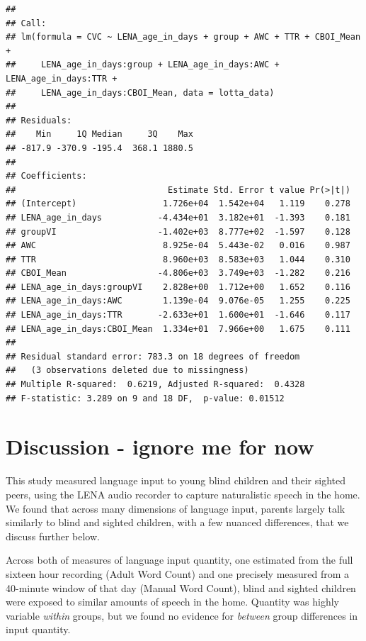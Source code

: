 \documentclass[
  man,floatsintext]{apa6}
\begin{document}
\begin{verbatim}
## 
## Call:
## lm(formula = CVC ~ LENA_age_in_days + group + AWC + TTR + CBOI_Mean + 
##     LENA_age_in_days:group + LENA_age_in_days:AWC + LENA_age_in_days:TTR + 
##     LENA_age_in_days:CBOI_Mean, data = lotta_data)
## 
## Residuals:
##    Min     1Q Median     3Q    Max 
## -817.9 -370.9 -195.4  368.1 1880.5 
## 
## Coefficients:
##                              Estimate Std. Error t value Pr(>|t|)
## (Intercept)                 1.726e+04  1.542e+04   1.119    0.278
## LENA_age_in_days           -4.434e+01  3.182e+01  -1.393    0.181
## groupVI                    -1.402e+03  8.777e+02  -1.597    0.128
## AWC                         8.925e-04  5.443e-02   0.016    0.987
## TTR                         8.960e+03  8.583e+03   1.044    0.310
## CBOI_Mean                  -4.806e+03  3.749e+03  -1.282    0.216
## LENA_age_in_days:groupVI    2.828e+00  1.712e+00   1.652    0.116
## LENA_age_in_days:AWC        1.139e-04  9.076e-05   1.255    0.225
## LENA_age_in_days:TTR       -2.633e+01  1.600e+01  -1.646    0.117
## LENA_age_in_days:CBOI_Mean  1.334e+01  7.966e+00   1.675    0.111
## 
## Residual standard error: 783.3 on 18 degrees of freedom
##   (3 observations deleted due to missingness)
## Multiple R-squared:  0.6219, Adjusted R-squared:  0.4328 
## F-statistic: 3.289 on 9 and 18 DF,  p-value: 0.01512
\end{verbatim}

\hypertarget{discussion---ignore-me-for-now}{%
\section{Discussion - ignore me for now}\label{discussion---ignore-me-for-now}}

This study measured language input to young blind children and their sighted peers, using the LENA audio recorder to capture naturalistic speech in the home. We found that across many dimensions of language input, parents largely talk similarly to blind and sighted children, with a few nuanced differences, that we discuss further below.

Across both of measures of language input quantity, one estimated from the full sixteen hour recording (Adult Word Count) and one precisely measured from a 40-minute window of that day (Manual Word Count), blind and sighted children were exposed to similar amounts of speech in the home. Quantity was highly variable \emph{within} groups, but we found no evidence for \emph{between} group differences in input quantity.
\end{document}
